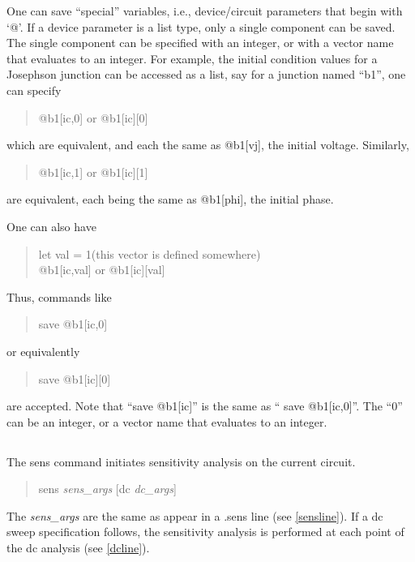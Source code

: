 One can save ``special'' variables, i.e., device/circuit parameters
that begin with `{\vt @}'.  If a device parameter is a list type, only
a single component can be saved.  The single component can be
specified with an integer, or with a vector name that evaluates to an
integer.  For example, the initial condition values for a Josephson
junction can be accessed as a list, say for a junction named ``b1'',
one can specify
\begin{quote}
{\vt @b1[ic,0]} or {\vt @b1[ic][0]}
\end{quote}
which are equivalent, and each the same as {\vt @b1[vj]}, the initial
voltage.  Similarly,
\begin{quote}
{\vt @b1[ic,1]} or {\vt @b1[ic][1]}
\end{quote}
are equivalent, each being the same as {\vt @b1[phi]}, the initial
phase.

One can also have
\begin{quote}
{\vt let val = 1}\qquad\qquad (this vector is defined somewhere)\\
{\vt @b1[ic,val]} or {\vt @b1[ic][val]}
\end{quote}
Thus, commands like
\begin{quote}
{\vt save @b1[ic,0]}
\end{quote}
or equivalently
\begin{quote}
{\vt save @b1[ic][0]}
\end{quote}
are accepted.  Note that ``{\vt save @b1[ic]}'' is the same as ``{\vt
save @b1[ic,0]}''.  The ``0'' can be an integer, or a vector name that
evaluates to an integer.

\subsection{}


The {\cb sens} command initiates sensitivity analysis on the current
circuit.
\begin{quote}\vt
sens {\it sens\_args\/} [dc {\it dc\_args\/}]
\end{quote}
The {\it sens\_args} are the same as appear in a {\vt .sens} line
(see \ref{sensline}).  If a dc sweep specification follows, the
sensitivity analysis is performed at each point of the dc analysis
(see \ref{dcline}).

\subsection{}

